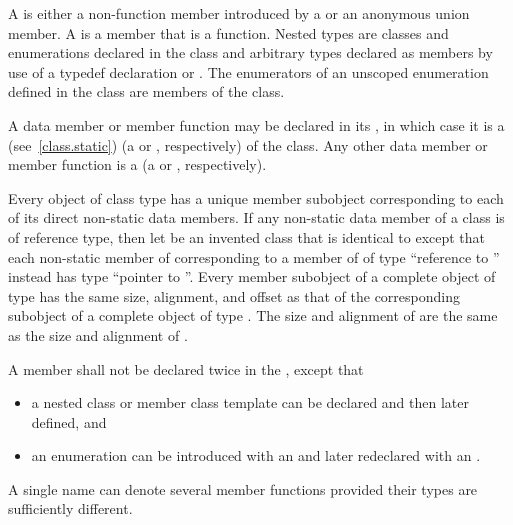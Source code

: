 \pnum
A  is either a non-function member introduced by a
 or an anonymous union member.
A  is a member that is a function.
Nested types are classes and
enumerations declared in the class and arbitrary types
declared as members by use of a typedef declaration
or .
The enumerators of an unscoped enumeration defined in the class
are members of the class.

\pnum
A data member or member function
may be declared  in its ,
in which case it is a  (see~\ref{class.static})
(a  or
, respectively)
of the class.
Any other data member or member function is a 
(a  or
, respectively).

\pnum
Every object of class type has a unique member subobject
corresponding to each of its direct non-static data members.
If any non-static data member of a class  is of reference type,
then let  be an invented class
that is identical to 
except that each non-static member of  corresponding to
a member of  of type ``reference to ''
instead has type ``pointer to ''.
Every member subobject of a complete object of type 
has the same size, alignment, and offset
as that of the corresponding subobject of a complete object of type .
The size and alignment of  are the same as
the size and alignment of .

\pnum
A member shall not be declared twice in the
, except that
\begin{itemize}
\item a nested class or member
class template can be declared and then later defined, and
\item an
enumeration can be introduced with an  and later
redeclared with an .
\end{itemize}
\begin{note}
A single name can denote several member functions provided their types
are sufficiently different.
\end{note}

